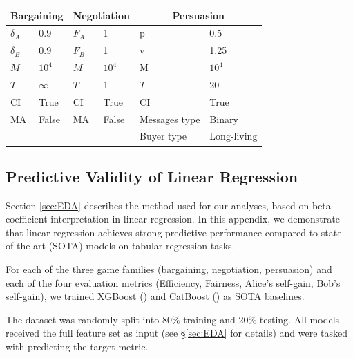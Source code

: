\begin{table}[t]
\begin{tabular}{ll|ll|ll}
\toprule
\multicolumn{2}{c|}{\textbf{Bargaining}} & \multicolumn{2}{c|}{\textbf{Negotiation}} & \multicolumn{2}{c}{\textbf{Persuasion}} \\
\midrule
$\delta_A$       & 0.9           & $F_A$          & 1               & p                   & 0.5 \\
$\delta_B$       & 0.9           & $F_B$          & 1               & v                   & 1.25 \\
$M$              & $10^4$        & $M$            & $10^4$          & M                   & $10^4$ \\
$T$              & $\infty$      & $T$            & 1               & $T$                 & 20 \\
CI               & True          & CI             & True            & CI                  & True \\
MA               & False         & MA             & False           & Messages type       & Binary \\
                 &               &                &                 & Buyer type           & Long-living \\
\bottomrule
\end{tabular}
\label{tab:default_params}
\end{table}



\subsection{Predictive Validity of Linear Regression}
\label{app:stat_analisys:validity}
Section \ref{sec:EDA} describes the method used for our analyses, based on beta coefficient interpretation in linear regression. In this appendix, we demonstrate that linear regression achieves strong predictive performance compared to state-of-the-art (SOTA) models on tabular regression tasks.

For each of the three game families (bargaining, negotiation, persuasion) and each of the four evaluation metrics (Efficiency, Fairness, Alice’s self-gain, Bob’s self-gain), we trained XGBoost (\cite{chen2016xgboost}) and CatBoost (\cite{prokhorenkova2018catboost}) as SOTA baselines.

The dataset was randomly split into 80\% training and 20\% testing. All models received the full feature set as input (see \S\ref{sec:EDA} for details) and were tasked with predicting the target metric.

